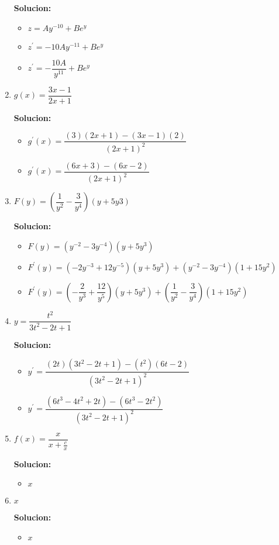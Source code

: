 \documentclass{article}
\begin{document}
\begin{enumerate}[start=5, label=\textbf{\arabic*.}]
    \textbf{Solucion: }
    \begin{itemize}
        \item $z = Ay^{-10} + Be^y$
        \item $z^{\prime} = -10Ay^{-11} + Be^y$
        \item $z^{\prime} = -\dfrac{10A}{y^{11}} + Be^y$
    \end{itemize}
    \vspace{0.5em}
    
    \item $g(x) = \dfrac{3x-1}{2x+1}$
    
    \textbf{Solucion: }
    \begin{itemize}
        \item $g^{\prime}(x) = \dfrac{(3)(2x+1) - (3x-1)(2)}{(2x+1)^2}$
        \item $g^{\prime}(x) = \dfrac{(6x+3) - (6x-2)}{(2x+1)^2}$
    \end{itemize}
    \vspace{0.5em}
        
    \item $F(y) = \left(\dfrac{1}{y^2}-\dfrac{3}{y^4}\right)(y+5y3)$
    
    \textbf{Solucion: }
    \begin{itemize}
        \item $F(y) = (y^{-2}-3y^{-4})(y+5y^3)$
        \item $F^{\prime}(y) = (-2y^{-3}+12y^{-5})(y+5y^3) + (y^{-2}-3y^{-4})(1+15y^2)$
        \item $F^{\prime}(y) = \left(-\dfrac{2}{y^3}+\dfrac{12}{y^5}\right)(y+5y^3)+\left(\dfrac{1}{y^2}-\dfrac{3}{y^4}\right)(1+15y^2)$
    \end{itemize}
    \vspace{0.5em}
        
    \item $y = \dfrac{t^2}{3t^2-2t+1}$
    
    \textbf{Solucion: }
    \begin{itemize}
        \item $y^{\prime} = \dfrac{(2t)(3t^2-2t+1) - (t^2)(6t-2)}{(3t^2-2t+1)^2}$
        \item $y^{\prime} = \dfrac{(6t^3-4t^2+2t) - (6t^3-2t^2)}{(3t^2-2t+1)^2}$
    \end{itemize}
    \vspace{0.5em}
        
    \item $f(x) = \dfrac{x}{x+\frac{c}{x}}$
    
    \textbf{Solucion: }
    \begin{itemize}
        \item $x$
    \end{itemize}
    \vspace{0.5em}
        
    \item $x$
    
    \textbf{Solucion: }
    \begin{itemize}
        \item $x$
    \end{itemize}
    \vspace{0.5em}

    \end{enumerate}
\end{document}
